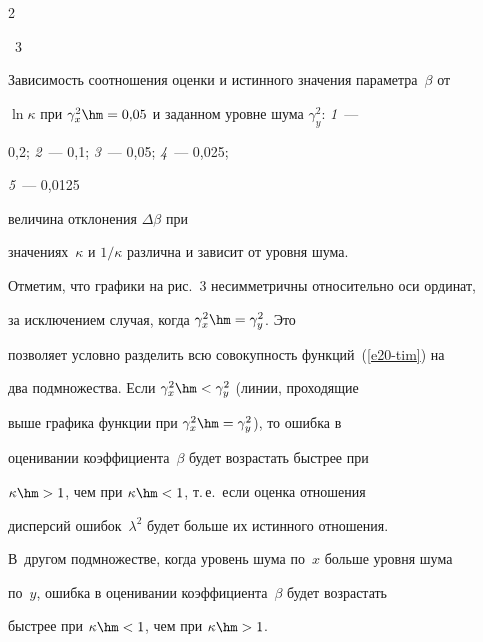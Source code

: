 \begin{multicols}{2}
\begin{center}
{ \epsfxsize=72.926mm


 }

 \end{center}


{{\figurename~3}\ \ \small{Зависимость соотношения оценки и истинного значения параметра~$\beta$ от

$\ln \kappa$ при $\gamma_x^2\hm=0{,}05$ и заданном уровне шума $\gamma_y^2$: \textit{1}~--- 

0,2; \textit{2}~--- 0,1; \textit{3}~--- 0,05; \textit{4}~--- 0,025;

\textit{5}~--- 0,0125}}






\addtocounter{figure}{1}







\noindent

 величина отклонения $\Delta\beta$ при

значениях~$\kappa$ и $1/\kappa$  различна и зависит от уровня шума.

Отметим, что графики на рис.~3 несимметричны относительно оси ординат,

за исключением случая, когда $\gamma_x^2\hm=\gamma_y^2$. Это

позволяет условно разделить всю совокупность функций~(\ref{e20-tim}) на

два подмножества. Если $\gamma_x^2\hm<\gamma_y^2$ (линии, проходящие

выше графика функции при $\gamma_x^2\hm=\gamma_y^2$), то ошибка в

оценивании коэффициента~$\beta$ будет возрастать быстрее при

$\kappa\hm>1$, чем при $\kappa\hm<1$, т.\,е.\ если оценка отношения

дисперсий ошибок~$\lambda^2$ будет больше их истинного отношения.

В~другом подмножестве, когда уровень шума по~$x$ больше уровня шума

по~$y$, ошибка в оценивании коэффициента~$\beta$ будет возрастать

быстрее при $\kappa\hm<1$, чем при $\kappa\hm>1$.






\end{multicols}
